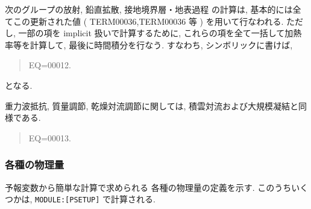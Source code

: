 次のグループの放射, 鉛直拡散, 接地境界層・地表過程
の計算は, 基本的には全てこの更新された値
( TERM00036,TERM00036 等 )
を用いて行なわれる.
ただし, 一部の項を implicit 扱いで計算するために,
これらの項を全て一括して加熱率等を計算して, 
最後に時間積分を行なう.
すなわち, シンボリックに書けば,
\begin{quote}
EQ=00012.
\end{quote}
となる.

重力波抵抗, 質量調節, 乾燥対流調節に関しては,
積雲対流および大規模凝結と同様である.
\begin{quote}
EQ=00013.
\end{quote}



\subsubsection{各種の物理量}

予報変数から簡単な計算で求められる
各種の物理量の定義を示す.
このうちいくつかは, 
\texttt{MODULE:[PSETUP]} で計算される.

